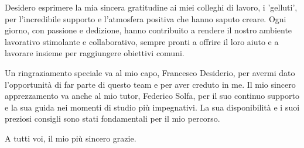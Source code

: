 Desidero esprimere la mia sincera gratitudine ai miei colleghi di lavoro, i 'gelluti', per l'incredibile supporto e l'atmosfera positiva che hanno saputo creare. Ogni giorno, con passione e dedizione, hanno contribuito a rendere il nostro ambiente lavorativo stimolante e collaborativo, sempre pronti a offrire il loro aiuto e a lavorare insieme per raggiungere obiettivi comuni. \vspace{5pt}

Un ringraziamento speciale va al mio capo, Francesco Desiderio, per avermi dato l'opportunità di far parte di questo team e per aver creduto in me. Il mio sincero apprezzamento va anche al mio tutor, Federico Solfa, per il suo continuo supporto e la sua guida nei momenti di studio più impegnativi. La sua disponibilità e i suoi preziosi consigli sono stati fondamentali per il mio percorso.\vspace{200pt}

A tutti voi, il mio più sincero grazie.